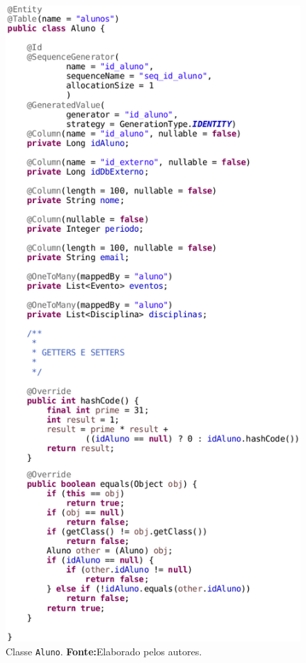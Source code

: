 		\begin{figure}[h!]
			\centerline{\includegraphics[scale=0.7]{./imagens/2_q_metodologico/qm10.png}}
			\caption[Classe \texttt{Aluno}]{Classe \texttt{Aluno}.
			\textbf{Fonte:}Elaborado pelos autores.}
			\label{fig:qm10} 
		\end{figure}
		
